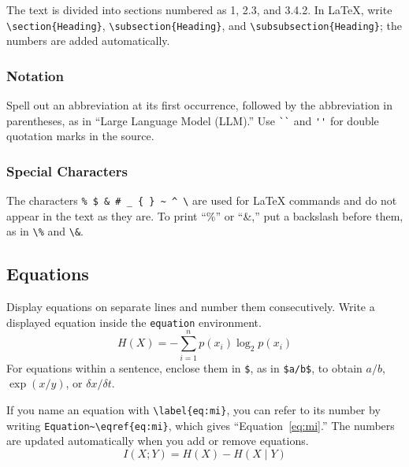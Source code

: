 \documentclass[paper,english]{bunkajoho}
\begin{document}
The text is divided into sections numbered as 1, 2.3, and 3.4.2.
In \LaTeX, write \verb|\section{Heading}|, \verb|\subsection{Heading}|, and \verb|\subsubsection{Heading}|; the numbers are added automatically.

\subsubsection{Notation}

Spell out an abbreviation at its first occurrence, followed by the abbreviation in parentheses, as in ``Large Language Model (LLM).''
Use \verb|``| and \verb|''| for double quotation marks in the source.

\subsubsection{Special Characters}

The characters \verb|% $ & # _ { } ~ ^ \| are used for \LaTeX{} commands and do not appear in the text as they are.
To print ``\%'' or ``\&,'' put a backslash before them, as in \verb|\%| and \verb|\&|.

\subsection{Equations}

Display equations on separate lines and number them consecutively.
Write a displayed equation inside the \verb|equation| environment.
\begin{equation}
  H(X) = -\sum_{i=1}^{n} p(x_i) \log_2 p(x_i)
  \label{eq:entropy}
\end{equation}
For equations within a sentence, enclose them in \verb|$|, as in \verb|$a/b$|, to obtain $a/b$, $\exp(x/y)$, or $\delta x/\delta t$.

If you name an equation with \verb|\label{eq:mi}|, you can refer to its number by writing \verb|Equation~\eqref{eq:mi}|, which gives ``Equation~\eqref{eq:mi}.''
The numbers are updated automatically when you add or remove equations.
\begin{equation}
  I(X;Y) = H(X) - H(X \mid Y)
  \label{eq:mi}
\end{equation}
\end{document}
